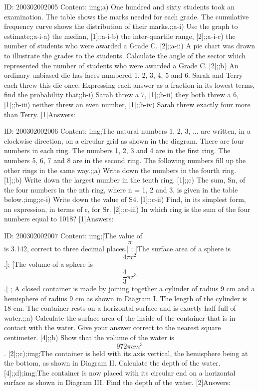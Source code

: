 \documentclass{article}
\begin{document}
ID: 200302002005
Content:
img;a) One hundred and sixty students took an examination. The table shows the marks needed for each grade. The cumulative frequency curve shows the distribution of their marks.;;a-i) Use the graph to estimate;;a-i-a) the median, [1];;a-i-b) the inter-quartile range, [2];;a-i-c) the number of students who were awarded a Grade C. [2];;a-ii) A pie chart was drawn to illustrate the grades to the students. Calculate the angle of the sector which represented the number of students who were awarded a Grade C. [2];;b) An ordinary unbiased die has faces numbered 1, 2, 3, 4, 5 and 6. Sarah and Terry each threw this die once. Expressing each answer as a fraction in its lowest terms, find the probability that;;b-i) Sarah threw a 7, [1];;b-ii) they both threw a 6, [1];;b-iii) neither threw an even number, [1];;b-iv) Sarah threw exactly four more than Terry. [1]Answers:

ID: 200302002006
Content:
img;The natural numbers 1, 2, 3, ... are written, in a clockwise direction, on a circular grid as shown in the diagram. There are four numbers in each ring. The numbers 1, 2, 3 and 4 are in the first ring. The numbers 5, 6, 7 and 8 are in the second ring. The following numbers fill up the other rings in the same way.;;a) Write down the numbers in the fourth ring. [1];;b) Write down the largest number in the tenth ring. [1];;c) The sum, Sn, of the four numbers in the nth ring, where n = 1, 2 and 3, is given in the table below.;img;;c-i) Write down the value of S4. [1];;c-ii) Find, in its simplest form, an expression, in terms of r, for Sr. [2];;c-iii) In which ring is the sum of the four numbers equal to 1018? [1]Answers:

ID: 200302002007
Content:
img;[The value of $$\pi$$ is 3.142, correct to three decimal places.] ; [The surface area of a sphere is $$4 \pi r^{2} $$.]; [The volume of a sphere is $$\frac{4}{3} \pi r^{3} $$.] ; A closed container is made by joining together a cylinder of radius 9 cm and a hemisphere of radius 9 cm as shown in Diagram I. The length of the cylinder is 18 cm. The container rests on a horizontal surface and is exactly half full of water.;;a) Calculate the surface area of the inside of the container that is in contact with the water. Give your answer correct to the nearest square centimeter. [4];;b) Show that the volume of the water is $$972\pi cm^{3} $$. [2];;c);img;The container is held with its axis vertical, the hemisphere being at the bottom, as shown in Diagram II. Calculate the depth of the water. [4];;d);img;The container is now placed with its circular end on a horizontal surface as shown in Diagram III. Find the depth of the water. [2]Answers:
\end{document}
